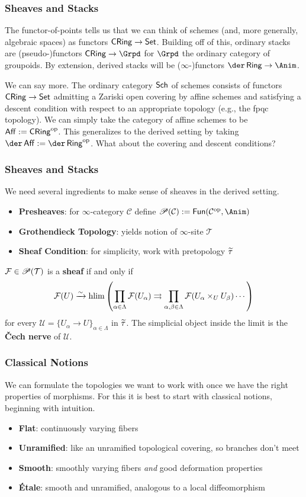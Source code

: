 \documentclass[11pt]{beamer}
\renewcommand{\C}{\mathcal{C}}
\renewcommand{\F}{\mathcal{F}}
\newcommand{\T}{\mathcal{T}}
\newcommand{\U}{\mathcal{U}}
\begin{document}
\begin{frame}
\frametitle{Sheaves and Stacks}
\pause The functor-of-points tells us that we can think of schemes (and, more generally, algebraic spaces) as functors $\operatorname{\mathsf{CRing}}\to\operatorname{\mathsf{Set}}$. \pause Building off of this, ordinary stacks are (pseudo-)functors $\CRing\to\Grpd$ for $\Grpd$ the ordinary category of groupoids. \pause By extension, derived stacks will be ($\infty$-)functors $\der\Ring\to\Anim$. 

\pause We can say more. The ordinary category $\operatorname{\mathsf{Sch}}$ of schemes consists of functors $\operatorname{\mathsf{CRing}}\to\operatorname{\mathsf{Set}}$ admitting a Zariski open covering by affine schemes and satisfying a descent condition with respect to an appropriate topology (e.g., the fpqc topology). \pause We can simply take the category of affine schemes to be $\operatorname{\mathsf{Aff}}:=\operatorname{\mathsf{CRing}}^{\operatorname{op}}$. \pause This generalizes to the derived setting by taking $\der\Aff:=\der\Ring^{\op}$. What about the covering and descent conditions?
\end{frame}

\begin{frame}
\frametitle{Sheaves and Stacks}
\pause We need several ingredients to make sense of sheaves in the derived setting.
\begin{itemize}
\pause\item \textbf{Presheaves}: for $\infty$-category $\C$ define $\Pre(\C):=\Fun(\C^{\op},\Anim)$
\pause\item \textbf{Grothendieck Topology}: yields notion of $\infty$-site $\T$
\pause\item \textbf{Sheaf Condition}: for simplicity, work with pretopology $\widetilde{\tau}$
\end{itemize}
\pause $\F\in\Pre(\T)$ is a \textbf{sheaf} if and only if 
$$\F(U)\xto{\sim}\hlim\paren{\prod_{\alpha\in\Lambda}\F(U_{\alpha})\rightrightarrows\prod_{\alpha,\beta\in\Lambda}\F(U_{\alpha}\times_UU_{\beta})\cdots}$$
for every $\U=\{U_{\alpha}\to U\}_{\alpha\in\Lambda}$ in $\widetilde{\tau}$. The simplicial object inside the limit is the \textbf{\v{C}ech nerve} of $\U$.
\end{frame}

\begin{frame}
\frametitle{Classical Notions}
\pause We can formulate the topologies we want to work with once we have the right properties of morphisms. For this it is best to start with classical notions, beginning with intuition.
\begin{itemize}
\pause\item \textbf{Flat}: continuously varying fibers
\pause\item \textbf{Unramified}: like an unramified topological covering, so branches don't meet
\pause\item \textbf{Smooth}: smoothly varying fibers \emph{and} good deformation properties
\pause\item \textbf{\'{E}tale}: smooth and unramified, analogous to a local diffeomorphism
\end{itemize}
\end{frame}
\end{document}
